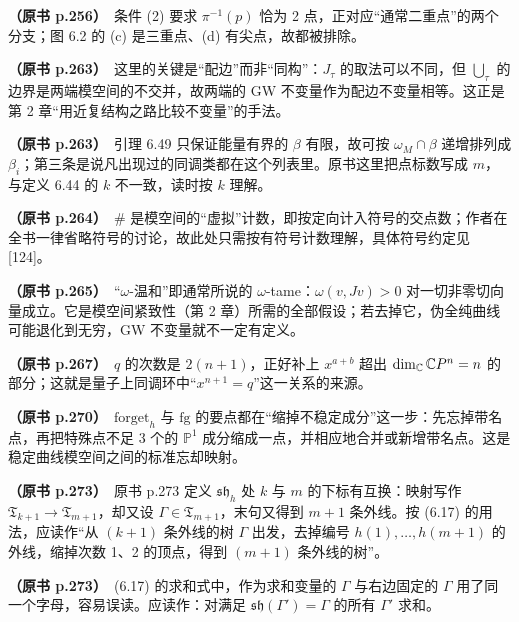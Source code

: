 \noindent \textbf{（原书 p.256）}\ 条件 (2) 要求 $\pi^{-1}(p)$ 恰为 2 点，正对应“通常二重点”的两个分支；图 6.2 的 (c) 是三重点、(d) 有尖点，故都被排除。\par\smallskip

\noindent \textbf{（原书 p.263）}\ 这里的关键是“配边”而非“同构”：$J_\tau$ 的取法可以不同，但 $\bigcup_\tau$ 的边界是两端模空间的不交并，故两端的 GW 不变量作为配边不变量相等。这正是第 2 章“用近复结构之路比较不变量”的手法。\par\smallskip

\noindent \textbf{（原书 p.263）}\ 引理 6.49 只保证能量有界的 $\beta$ 有限，故可按 $\omega_M\cap\beta$ 递增排列成 $\beta_i$；第三条是说凡出现过的同调类都在这个列表里。原书这里把点标数写成 $m$，与定义 6.44 的 $k$ 不一致，读时按 $k$ 理解。\par\smallskip

\noindent \textbf{（原书 p.264）}\ $\#$ 是模空间的“虚拟”计数，即按定向计入符号的交点数；作者在全书一律省略符号的讨论，故此处只需按有符号计数理解，具体符号约定见 [124]。\par\smallskip

\noindent \textbf{（原书 p.265）}\ “$\omega$-温和”即通常所说的 $\omega$-tame：$\omega(v,Jv)>0$ 对一切非零切向量成立。它是模空间紧致性（第 2 章）所需的全部假设；若去掉它，伪全纯曲线可能退化到无穷，GW 不变量就不一定有定义。\par\smallskip

\noindent \textbf{（原书 p.267）}\ $q$ 的次数是 $2(n+1)$，正好补上 $x^{a+b}$ 超出 $\dim_{\mathbb{C}}\mathbb{C}P^n=n$ 的部分；这就是量子上同调环中“$x^{n+1}=q$”这一关系的来源。\par\smallskip

\noindent \textbf{（原书 p.270）}\ $\mathrm{forget}_h$ 与 $\mathrm{fg}$ 的要点都在“缩掉不稳定成分”这一步：先忘掉带名点，再把特殊点不足 3 个的 $\mathbb P^1$ 成分缩成一点，并相应地合并或新增带名点。这是稳定曲线模空间之间的标准忘却映射。\par\smallskip

\noindent \textbf{（原书 p.273）}\ 原书 p.273 定义 $\mathfrak{sh}_h$ 处 $k$ 与 $m$ 的下标有互换：映射写作 $\mathfrak{T}_{k+1}\to\mathfrak{T}_{m+1}$，却又设 $\Gamma\in\mathfrak{T}_{m+1}$，末句又得到 $m+1$ 条外线。按 (6.17) 的用法，应读作“从 $(k+1)$ 条外线的树 $\Gamma$ 出发，去掉编号 $h(1),\dots,h(m+1)$ 的外线，缩掉次数 1、2 的顶点，得到 $(m+1)$ 条外线的树”。\par\smallskip

\noindent \textbf{（原书 p.273）}\ (6.17) 的求和式中，作为求和变量的 $\Gamma$ 与右边固定的 $\Gamma$ 用了同一个字母，容易误读。应读作：对满足 $\mathfrak{sh}(\Gamma')=\Gamma$ 的所有 $\Gamma'$ 求和。\par\smallskip

